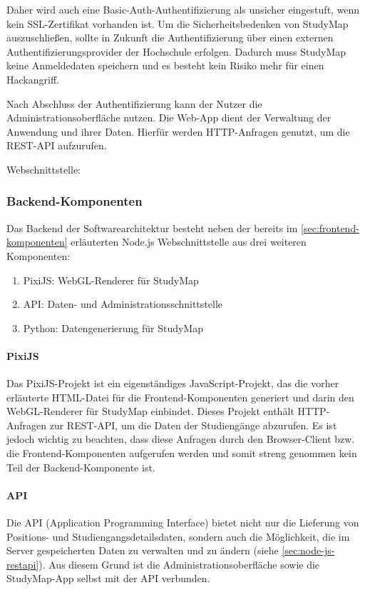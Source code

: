 Daher wird auch eine Basic-Auth-Authentifizierung als unsicher eingestuft, wenn kein SSL-Zertifikat vorhanden ist. Um die Sicherheitsbedenken von StudyMap auszuschließen, sollte in Zukunft die Authentifizierung über einen externen Authentifizierungsprovider der Hochschule erfolgen. Dadurch muss StudyMap keine Anmeldedaten speichern und es besteht kein Risiko mehr für einen Hackangriff.

Nach Abschluss der Authentifizierung kann der Nutzer die Administrationsoberfläche nutzen. Die Web-App dient der Verwaltung der Anwendung und ihrer Daten. Hierfür werden HTTP-Anfragen genutzt, um die REST-API aufzurufen.

\noindent
Webschnittstelle: 

\subsubsection{Backend-Komponenten}
Das Backend der Softwarearchitektur besteht neben der bereits im \autoref{sec:frontend-komponenten} erläuterten Node.js Webschnittstelle aus drei weiteren Komponenten: \begin{enumerate}
    \item PixiJS: WebGL-Renderer für StudyMap
    \item API: Daten- und Administrationsschnittstelle
    \item Python: Datengenerierung für StudyMap
\end{enumerate}

\paragraph*{PixiJS}
Das PixiJS-Projekt ist ein eigenständiges JavaScript-Projekt, das die vorher erläuterte HTML-Datei  für die Frontend-Komponenten generiert und darin den WebGL-Renderer für StudyMap einbindet. Dieses Projekt enthält HTTP-Anfragen zur REST-API, um die Daten der Studiengänge abzurufen. Es ist jedoch wichtig zu beachten, dass diese Anfragen durch den Browser-Client bzw. die Frontend-Komponenten aufgerufen werden und somit streng genommen kein Teil der Backend-Komponente ist.

\paragraph*{API}
Die API (Application Programming Interface) bietet nicht nur die Lieferung von Positions- und Studiengangsdetailsdaten, sondern auch die Möglichkeit, die im Server gespeicherten Daten zu verwalten und zu ändern (siehe \autoref{sec:node-js-restapi}). Aus diesem Grund ist die Administrationsoberfläche sowie die StudyMap-App selbst mit der API verbunden.


